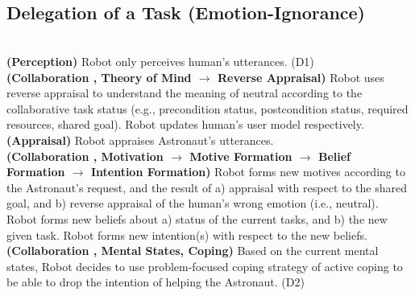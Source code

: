 \noindent{}\\

\noindent{}\\

\subsection{Delegation of a Task (Emotion-Ignorance)}
\label{sec:wt-exp4}

\noindent{}\\

\noindent\textbf{(Perception)} Robot only perceives human's utterances. (D1)\\

\noindent\textbf{(Collaboration , Theory of Mind $\rightarrow$ Reverse
Appraisal)} Robot uses reverse appraisal to understand the meaning of neutral
according to the collaborative task status (e.g., precondition status,
postcondition status, required resources, shared goal). Robot updates human's
user model respectively.\\

\noindent\textbf{(Appraisal)} Robot appraises Astronaut's utterances.\\

\noindent\textbf{(Collaboration , Motivation $\rightarrow$ Motive Formation
$\rightarrow$ Belief Formation $\rightarrow$ Intention Formation)} Robot forms
new motives according to the Astronaut's request, and the result of a) appraisal
with respect to the shared goal, and b) reverse appraisal of the human's wrong
emotion (i.e., neutral). Robot forms new beliefs about a) status of the current
tasks, and b) the new given task. Robot forms new intention(s) with respect to
the new beliefs.\\

\noindent\textbf{(Collaboration , Mental States, Coping)} Based on the current
mental states, Robot decides to use problem-focused coping strategy of active
coping to be able to drop the intention of helping the Astronaut. (D2)\\

